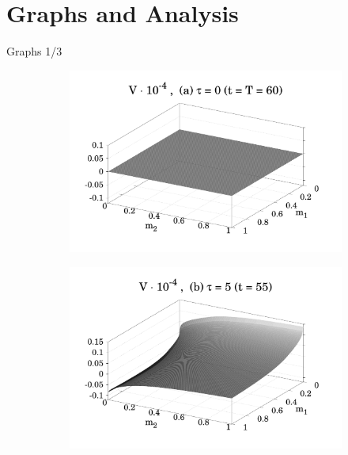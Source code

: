 \documentclass{beamer}
\begin{document}
\section{Graphs and Analysis}
\begin{frame}{Graphs 1/3}
    \begin{figure}
        \centering
        \begin{subfigure}{.48 \textwidth}
            \includegraphics[width = \textwidth]{figures/Figure_4a.pdf}
            \label{fig_4_a}
        \end{subfigure}
        \begin{subfigure}{.48 \textwidth}
            \includegraphics[width = \textwidth]{figures/Figure_4b_1.pdf}
            \label{fig_4_b}
        \end{subfigure}
        \begin{subfigure}{.48 \textwidth}

\end{subfigure}
\end{figure}
\end{frame}
\end{document}
